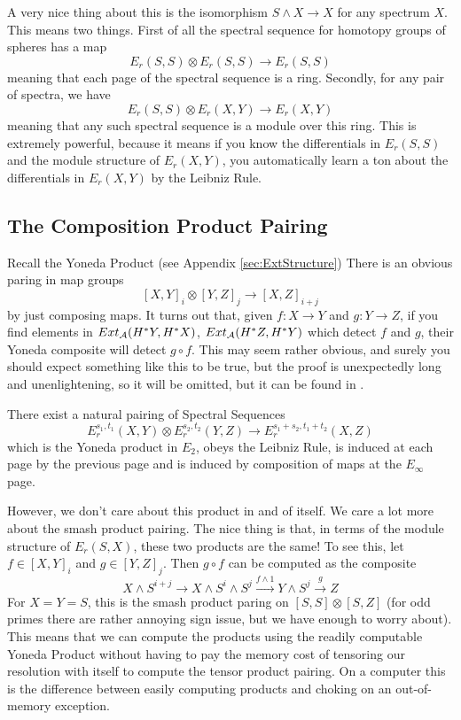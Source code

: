 A very nice thing about this is the isomorphism $S\wedge X\to X$ for any spectrum $X$.
This means two things.
First of all the spectral sequence for homotopy groups of spheres has a map
\[E_r(S,S)\otimes E_r(S,S)\to E_r(S,S)\]
meaning that each page of the spectral sequence is a ring.
Secondly, for any pair of spectra, we have
\[E_r(S,S)\otimes E_r(X,Y)\to E_r(X,Y)\]
meaning that any such spectral sequence is a module over this ring.
This is extremely powerful, because it means if you know the differentials in $E_r(S,S)$ and the module structure of $E_r(X,Y)$, you automatically learn a ton about the differentials in $E_r(X,Y)$ by the Leibniz Rule.  


\subsection{The Composition Product Pairing}
Recall the Yoneda Product (see Appendix \ref{sec:ExtStructure})
There is an obvious paring in map groups
\[[X,Y]_i\otimes [Y,Z]_j \to [X,Z]_{i+j}\]
by just composing maps.  
It turns out that, given $f:X\to Y$ and $g:Y\to Z$, if you find elements in $Ext_{\mathcal{A}}(H^*Y,H^*X)$, $Ext_{\mathcal{A}}(H^*Z,H^*Y)$ which detect $f$ and $g$, their Yoneda composite will detect $g\circ f$.  
This may seem rather obvious, and surely you should expect something like this to be true, but the proof is unexpectedly long and unenlightening, so it will be omitted, but it can be found in \cite{mossProduct}.  
\begin{Theorem}
  There exist a natural pairing of Spectral Sequences
  \[E^{s_1,t_1}_r(X,Y)\otimes E_r^{s_2,t_2}(Y,Z)\to E^{s_1+s_2,t_1+t_2}_r(X,Z)\]
  which is the Yoneda product in $E_2$, obeys the Leibniz Rule, is induced at each page by the previous page and is induced by composition of maps at the $E_\infty$ page.  
\end{Theorem}

However, we don't care about this product in and of itself.  
We care a lot more about the smash product pairing.
The nice thing is that, in terms of the module structure of $E_r(S,X)$, these two products are the same!
To see this, let $f\in [X,Y]_i$ and $g\in [Y,Z]_j$.  Then $g\circ f$ can be computed as the composite
\[X\wedge S^{i+j}\to X\wedge S^i\wedge S^j\xrightarrow{f\wedge1} Y\wedge S^j\xrightarrow{g} Z\]
For $X=Y=S$, this is the smash product paring on $[S,S]\otimes [S,Z]$ (for odd primes there are rather annoying sign issue, but we have enough to worry about).  
This means that we can compute the products using the readily computable Yoneda Product without having to pay the memory cost of tensoring our resolution with itself to compute the tensor product pairing.  
On a computer this is the difference between easily computing products and choking on an out-of-memory exception.  

